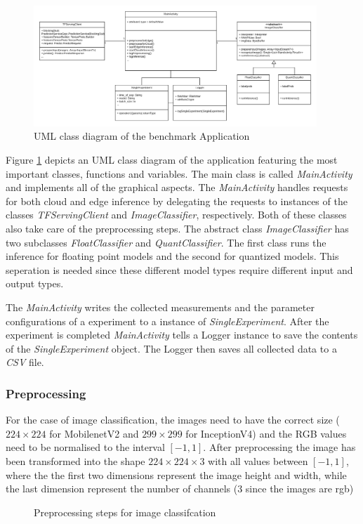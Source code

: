 \begin{figure}[htb]
\centering
\includegraphics[width=0.95\textwidth]{./Bilder/UML.png}
\caption{UML class diagram of the benchmark Application}
\label{fig:UML}
\end{figure}
Figure \ref{fig:UML} depicts an UML class diagram of the application featuring the most important classes, functions and variables. 
The main class is called \emph{MainActivity} and implements all of the graphical aspects. 
The \emph{MainActivity} handles requests for both cloud and edge inference by delegating the requests to instances of the classes \emph{TFServingClient} and \emph{ImageClassifier}, respectively. Both of these classes also take care of the preprocessing steps.
The abstract class \emph{ImageClassifier} has two subclasses \emph{FloatClassifier} and \emph{QuantClassifier}. The first class runs the inference for floating point models and the second for quantized models.
This seperation is needed since these different model types require different input and output types.

The \emph{MainActivity} writes the collected measurements and the parameter configurations of a experiment to a instance of \emph{SingleExperiment}. After the experiment is completed \emph{MainActivity} tells a Logger instance to save the contents of the \emph{SingleExperiment} object. The Logger then saves all collected data to a \emph{CSV} file.

\subsubsection{Preprocessing}
For the case of image classification, the images need to have the correct size ($224\times224$ for MobilenetV2 and $299\times299$ for InceptionV4) and the RGB values need to be normalised to the interval $[-1,1]$. After preprocessing the image has been transformed into the shape $224\times224\times3$ with all values between $[-1,1]$, where the the first two dimensions represent the image height and width, while the last dimension represent the number of channels (3 since the images are rgb)
\begin{figure}[H]
\centering

\caption{Preprocessing steps for image classifcation}
\label{fig:prepro}
\end{figure}
